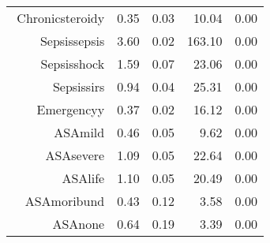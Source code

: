 \begin{tabular}{rrrrr}
$$  Chronic\-steroid\-y & 0.35 & 0.03 & 10.04 & 0.00 \\ 
  Sepsis\-sepsis & 3.60 & 0.02 & 163.10 & 0.00 \\ 
  Sepsis\-shock & 1.59 & 0.07 & 23.06 & 0.00 \\ 
  Sepsis\-sirs & 0.94 & 0.04 & 25.31 & 0.00 \\ 
  Emergency\-y & 0.37 & 0.02 & 16.12 & 0.00 \\ 
  ASA\-mild & 0.46 & 0.05 & 9.62 & 0.00 \\ 
  ASA\-severe & 1.09 & 0.05 & 22.64 & 0.00 \\ 
  ASA\-life & 1.10 & 0.05 & 20.49 & 0.00 \\ 
  ASA\-moribund & 0.43 & 0.12 & 3.58 & 0.00 \\ 
  ASA\-none & 0.64 & 0.19 & 3.39 & 0.00 \\ 
   \hline
\end{tabular}

